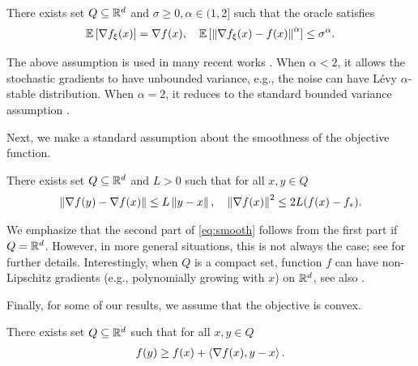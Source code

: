 \documentclass{article}
\begin{document}
\begin{assumption}\label{asm:heavy-tailed}
    There exists set $Q \subseteq {\mathbb R}^d$ and $\sigma \geq 0, \alpha \in (1,2]$ such that the oracle satisfies
    \begin{align}
        {\mathbb E}\left[\nabla f_{\xi}(x)\right] =  \nabla f(x),\quad {\mathbb E}\left[\left\lVert\nabla f_{\xi}(x) - f(x)\right\rVert^\alpha\right] \leq \sigma^\alpha. \label{eq:bounded_alpha_mom}
    \end{align}
\end{assumption}

The above assumption is used in many recent works \citep{zhang2020adaptive, cutkosky2021high, sadiev2023high, nguyen2023improved}. When $\alpha < 2$, it allows the stochastic gradients to have unbounded variance, e.g., the noise can have L\'evy $\alpha$-stable distribution. When $\alpha = 2$, it reduces to the standard bounded variance assumption \citep{nemirovski2009robust, ghadimi2012optimal, ghadimi2013stochastic,takavc2013mini}.


Next, we make a standard assumption about the smoothness of the objective function.
\begin{assumption}\label{asm:smoothness}
    There exists set $Q \subseteq {\mathbb R}^d$ and $L>0$ such that for all $x,y \in Q$
    \begin{align}
        \left\lVert\nabla f(y) - \nabla f(x)\right\rVert \leq L\left\lVert y - x\right\rVert,\quad {\left\lVert\nabla f(x)\right\rVert}^2 \leq 2L(f(x) - f_*). \label{eq:smooth}
    \end{align}
\end{assumption}
We emphasize that the second part of \eqref{eq:smooth} follows from the first part if $Q = {\mathbb R}^d$. However, in more general situations, this is not always the case; see \citep[Appendix B]{sadiev2023high} for further details. Interestingly, when $Q$ is a compact set, function $f$ can have non-Lipschitz gradients (e.g., polynomially growing with $x$) on ${\mathbb R}^d$, see also \citep{patel2022global, patel2022gradient}.

Finally, for some of our results, we assume that the objective is convex.
\begin{assumption}[Optional]\label{asm:convexity}
    There exists set $Q \subseteq {\mathbb R}^d$ such that for all $x,y \in Q$
    \begin{align}
        f(y) \geq f(x) + \left \langle \nabla f(x), y - x \right \rangle.  \label{eq:convex}
    \end{align}
\end{assumption}
\end{document}
